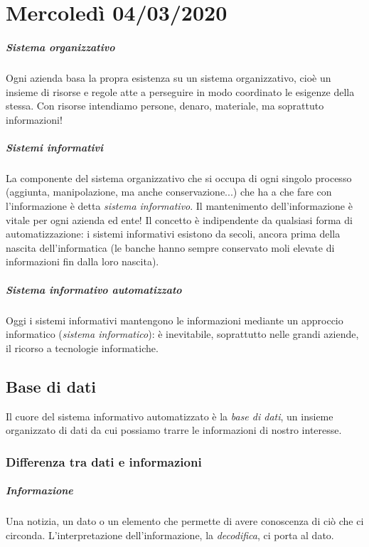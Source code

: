 \chapter{Mercoledì 04/03/2020}
\paragraph{Sistema organizzativo} Ogni azienda basa la propra esistenza su un sistema organizzativo, cioè un insieme di risorse e regole atte a perseguire in modo coordinato le esigenze della stessa. Con risorse intendiamo persone, denaro, materiale, ma soprattuto informazioni!  
\paragraph{Sistemi informativi} La componente del sistema organizzativo che si occupa di ogni singolo processo (aggiunta, manipolazione, ma anche conservazione...) che ha a che fare con l'informazione è detta \emph{sistema informativo}. Il mantenimento dell'informazione è vitale per ogni azienda ed ente! Il concetto è indipendente da qualsiasi forma di automatizzazione: i sistemi informativi esistono da secoli, ancora prima della nascita dell'informatica (le banche hanno sempre conservato moli elevate di informazioni fin dalla loro nascita).
\paragraph{Sistema informativo automatizzato} Oggi i sistemi informativi mantengono le informazioni mediante un approccio informatico (\emph{sistema informatico}): è inevitabile, soprattutto nelle grandi aziende, il ricorso a tecnologie informatiche.

\section{Base di dati}
Il cuore del sistema informativo automatizzato è la \emph{base di dati}, un insieme organizzato di dati da cui possiamo trarre le informazioni di nostro interesse.

\subsection{Differenza tra dati e informazioni}
\paragraph{Informazione} Una notizia, un dato o un elemento che permette di avere conoscenza di ciò che ci circonda. L'interpretazione dell'informazione, la \emph{decodifica}, ci porta al dato.
